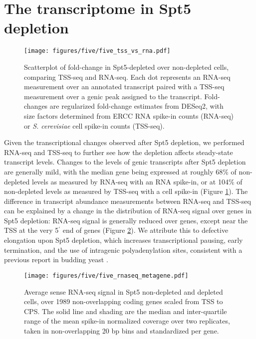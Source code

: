 \section{The transcriptome in Spt5 depletion}
\label{sec:five_transcriptome}

\begin{figure}[h]
    \centering
    \texttt{[image: figures/five/five\_tss\_vs\_rna.pdf]}
    \caption[Scatterplot of fold-change in Spt5-depleted over non-depleted cells, comparing TSS-seq and RNA-seq.]{Scatterplot of fold-change in Spt5-depleted over non-depleted cells, comparing TSS-seq and RNA-seq. Each dot represents an RNA-seq measurement over an annotated transcript paired with a TSS-seq measurement over a genic peak assigned to the transcript. Fold-changes are regularized fold-change estimates from DESeq2, with size factors determined from ERCC RNA spike-in counts (RNA-seq) or \textit{S. cerevisiae} cell spike-in counts (TSS-seq).}
    \label{fig:five_tss_vs_rna}
\end{figure}
Given the transcriptional changes observed after Spt5 depletion, we performed RNA-seq and TSS-seq to further see how the depletion affects steady-state transcript levels.
Changes to the levels of genic transcripts after Spt5 depletion are generally mild, with the median gene being expressed at roughly 68\% of non-depleted levels as measured by RNA-seq with an RNA spike-in, or at 104\% of non-depleted levels as measured by TSS-seq with a cell spike-in (Figure \ref{fig:five_tss_vs_rna}).
The difference in transcript abundance measurements between RNA-seq and TSS-seq can be explained by a change in the distribution of RNA-seq signal over genes in Spt5 depletion: RNA-seq signal is generally reduced over genes, except near the TSS at the very 5$^\prime$ end of genes (Figure \ref{fig:five_rnaseq_metagene}).
We attribute this to defective elongation upon Spt5 depletion, which increases transcriptional pausing, early termination, and the use of intragenic polyadenylation sites, consistent with a previous report in budding yeast \citep{cui2003}.
\begin{figure}[h]
    \centering
    \texttt{[image: figures/five/five\_rnaseq\_metagene.pdf]}
    \caption[Average sense RNA-seq signal over non-overlapping coding genes, from Spt5-depleted and non-depleted cells.]{Average sense RNA-seq signal in Spt5 non-depleted and depleted cells, over 1989 non-overlapping coding genes scaled from TSS to CPS. The solid line and shading are the median and inter-quartile range of the mean spike-in normalized coverage over two replicates, taken in non-overlapping 20 bp bins and standardized per gene.}
    \label{fig:five_rnaseq_metagene}
\end{figure}

